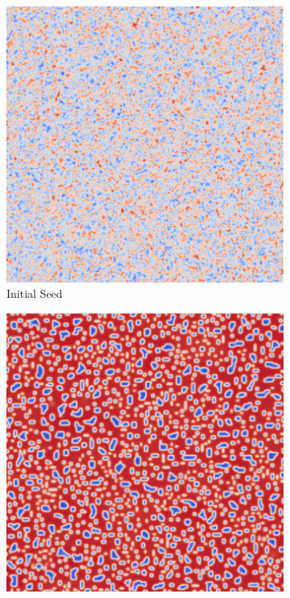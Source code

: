 \documentclass[12pt, letterpaper]{article}
\begin{document}
\begin{figure}[h]
  \caption{Cahn-Hilliard Examples at $t=2000$}
  \label{fig:cahnHilliardGraphs}
  \centering
  \begin{subfigure}[b]{.23\linewidth}
    \includegraphics[width=\linewidth]{CahnHilliard/ch0.png}
    \caption{Initial Seed}
  \end{subfigure}
  \begin{subfigure}[b]{.23\linewidth}
    \includegraphics[width=\linewidth]{CahnHilliard/ch125.png}

\end{subfigure}
\end{figure}
\end{document}
